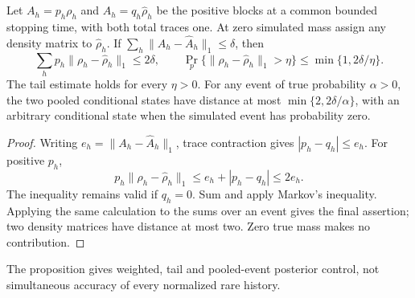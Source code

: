 \begin{proposition}\label{prop:posterior66}
Let $A_h=p_h\rho_h$ and $\widehat A_h=q_h\widehat\rho_h$ be the
positive blocks at a common bounded stopping time, with both total
traces one. At zero simulated mass assign any density matrix to
$\widehat\rho_h$. If
$\sum_h\|A_h-\widehat A_h\|_1\le\delta$, then
\begin{equation}\label{eq:posterior66}
 \sum_h p_h\|\rho_h-\widehat\rho_h\|_1\le2\delta,\qquad
 \Pr_p\{\|\rho_h-\widehat\rho_h\|_1>\eta\}
                              \le\min\{1,2\delta/\eta\}.
\end{equation}
The tail estimate holds for every $\eta>0$. For any event of true probability $\alpha>0$, the two pooled
conditional states have distance at most $\min\{2,2\delta/\alpha\}$,
with an arbitrary conditional state when the simulated event has
probability zero.
\end{proposition}
\begin{proof}
Writing $e_h=\|A_h-\widehat A_h\|_1$, trace contraction gives
$|p_h-q_h|\le e_h$. For positive $p_h$,
\[
 p_h\|\rho_h-\widehat\rho_h\|_1
 \le e_h+|p_h-q_h|\le2e_h.
\]
The inequality remains valid if $q_h=0$. Sum and apply Markov's
inequality. Applying the same calculation to the sums over an event
gives the final assertion; two density matrices have distance at most
two. Zero true mass makes no contribution.
\end{proof}
The proposition gives weighted, tail and pooled-event posterior control,
not simultaneous accuracy of every normalized rare history.
